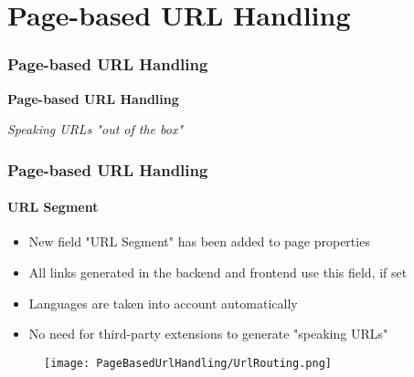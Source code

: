 %

\section{Page-based URL Handling}
\begin{frame}[fragile]
	\frametitle{Page-based URL Handling}

	\begin{center}\huge{\color{typo3darkgrey}\textbf{Page-based URL Handling}}\end{center}
	\begin{center}\large{\textit{Speaking URLs "out of the box"}}\end{center}

\end{frame}


\begin{frame}[fragile]
	\frametitle{Page-based URL Handling}
	\framesubtitle{URL Segment}

	\begin{itemize}
		\item New field "URL Segment" has been added to page properties
		\item All links generated in the backend and frontend use this field, if set
		\item Languages are taken into account automatically
		\item No need for third-party extensions to generate "speaking URLs"
	\end{itemize}

	\begin{figure}
		\texttt{[image: PageBasedUrlHandling/UrlRouting.png]}
	\end{figure}


\end{frame}

